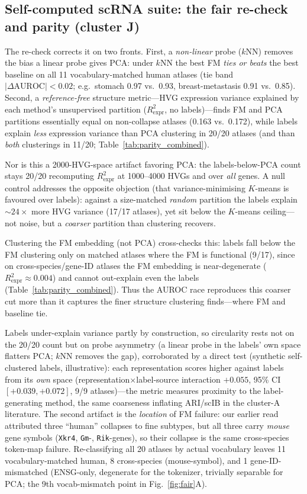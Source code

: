 \documentclass[journal]{IEEEtran}
\begin{document}
\subsection{Self-computed scRNA suite: the fair re-check and parity (cluster J)}
The re-check corrects it on two fronts. First, a \emph{non-linear} probe ($k$NN) removes the bias a linear probe gives PCA: under $k$NN the best FM \emph{ties or beats} the best baseline on all 11 vocabulary-matched human atlases (tie band $|\Delta\mathrm{AUROC}|<0.02$; e.g.\ stomach 0.97 vs.\ 0.93, breast-metastasis 0.91 vs.\ 0.85). Second, a \emph{reference-free} structure metric---HVG expression variance explained by each method's unsupervised partition ($R^2_{\mathrm{expr}}$, no labels)---finds FM and PCA partitions essentially equal on non-collapse atlases (0.163 vs.\ 0.172), while labels explain \emph{less} expression variance than PCA clustering in 20/20 atlases (and than \emph{both} clusterings in 11/20; Table~\ref{tab:parity_combined}).

Nor is this a 2000-HVG-space artifact favoring PCA: the labels-below-PCA count stays 20/20 recomputing $R^2_{\mathrm{expr}}$ at 1000--4000 HVGs and over \emph{all} genes. A null control addresses the opposite objection (that variance-minimising $K$-means is favoured over labels): against a size-matched \emph{random} partition the labels explain ${\sim}24\times$ more HVG variance (17/17 atlases), yet sit below the $K$-means ceiling---not noise, but a \emph{coarser} partition than clustering recovers.

Clustering the FM embedding (not PCA) cross-checks this: labels fall below the FM clustering only on matched atlases where the FM is functional (9/17), since on cross-species/gene-ID atlases the FM embedding is near-degenerate ($R^2_{\mathrm{expr}}\!\approx\!0.004$) and cannot out-explain even the labels (Table~\ref{tab:parity_combined}). Thus the AUROC race reproduces this coarser cut more than it captures the finer structure clustering finds---where FM and baseline tie.

Labels under-explain variance partly by construction, so circularity rests not on the 20/20 count but on probe asymmetry (a linear probe in the labels' own space flatters PCA; $k$NN removes the gap), corroborated by a direct test (synthetic self-clustered labels, illustrative): each representation scores higher against labels from its \emph{own} space (representation$\times$label-source interaction $+0.055$, 95\% CI $[+0.039,+0.072]$, 9/9 atlases)---the metric measures proximity to the label-generating method, the same coarseness inflating ARI/scIB in the cluster-A literature. The second artifact is the \emph{location} of FM failure: our earlier read attributed three ``human'' collapses to fine subtypes, but all three carry \emph{mouse} gene symbols (\texttt{Xkr4}, \texttt{Gm}-, \texttt{Rik}-genes), so their collapse is the same cross-species token-map failure. Re-classifying all 20 atlases by actual vocabulary leaves 11 vocabulary-matched human, 8 cross-species (mouse-symbol), and 1 gene-ID-mismatched (ENSG-only, degenerate for the tokenizer, trivially separable for PCA; the 9th vocab-mismatch point in Fig.~\ref{fig:fair}A).
\end{document}
